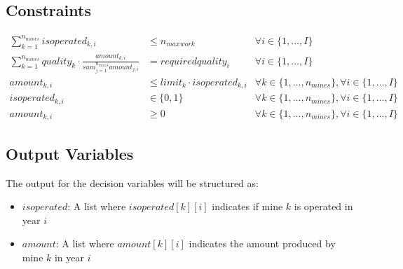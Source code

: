\documentclass{article}
\begin{document}
\subsection*{Constraints}
\begin{align}
\sum_{k=1}^{n_{mines}} isoperated_{k, i} & \leq n_{maxwork} & \forall i \in \{1, \ldots, I\} \\
\sum_{k=1}^{n_{mines}} quality_k \cdot \frac{amount_{k, i}}{sum_{j=1}^{n_{mines}} amount_{j, i}} & = requiredquality_i & \forall i \in \{1, \ldots, I\} \\
amount_{k, i} & \leq limit_k \cdot isoperated_{k, i} & \forall k \in \{1, \ldots, n_{mines}\}, \forall i \in \{1, \ldots, I\} \\
isoperated_{k, i} & \in \{0, 1\} & \forall k \in \{1, \ldots, n_{mines}\}, \forall i \in \{1, \ldots, I\} \\
amount_{k, i} & \geq 0 & \forall k \in \{1, \ldots, n_{mines}\}, \forall i \in \{1, \ldots, I\}
\end{align}

\subsection*{Output Variables}
The output for the decision variables will be structured as:
\begin{itemize}
    \item $isoperated$: A list where $isoperated[k][i]$ indicates if mine $k$ is operated in year $i$
    \item $amount$: A list where $amount[k][i]$ indicates the amount produced by mine $k$ in year $i$
\end{itemize}
\end{document}
